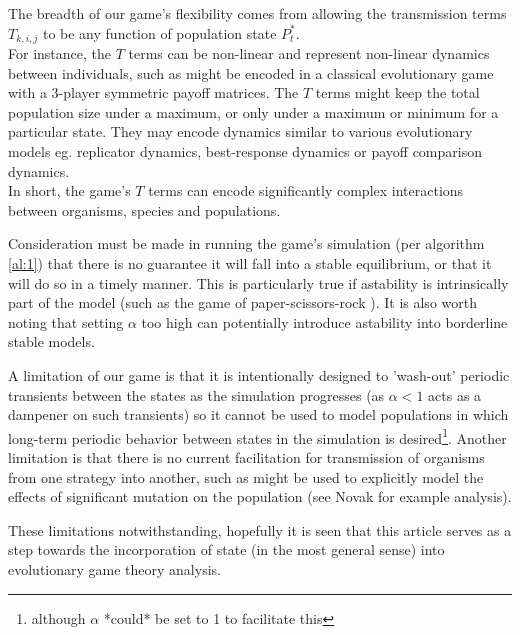 The breadth of our game's flexibility comes from allowing the transmission terms $T_{k,i,j}$ to be any function of population state $P^*_t$.\\
For instance, the $T$ terms can be non-linear and represent non-linear dynamics between individuals, such as might be encoded in a classical evolutionary game with a 3-player symmetric payoff matrices. The $T$ terms might keep the total population size under a maximum, or only under a maximum or minimum for a particular state. They may encode dynamics similar to various evolutionary models eg. replicator dynamics, best-response dynamics or payoff comparison dynamics.\cite{psr1}
\\
In short, the game's $T$ terms can encode significantly complex interactions between organisms, species and populations.

Consideration must be made in running the game's simulation (per algorithm \ref{al:1}) that there is no guarantee it will fall into a stable equilibrium, or that it will do so in a timely manner. This is particularly true if astability is intrinsically part of the model (such as the game of paper-scissors-rock \cite{rockpaperscissors}). It is also worth noting that setting $\alpha$ too high can potentially introduce astability into borderline stable models.

A limitation of our game is that it is intentionally designed to 'wash-out' periodic transients between the states as the simulation progresses (as $\alpha<1$ acts as a dampener on such transients) so it cannot be used to model populations in which long-term periodic behavior between states in the simulation is desired\footnote{although $\alpha$ *could* be set to 1 to facilitate this}.
Another limitation is that there is no current facilitation for transmission of organisms from one strategy into another, such as might be used to explicitly model the effects of significant mutation on the population (see Novak \cite{nowak} for example analysis).

These limitations notwithstanding, hopefully it is seen that this article serves as a step towards the incorporation of state (in the most general sense) into evolutionary game theory analysis.

